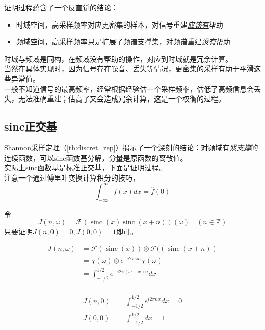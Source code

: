 	证明过程蕴含了一个反直觉的结论：

	\begin{itemize}
		\item 时域空间，高采样频率对应更密集的样本，对信号重建\underline{\textit{应该有}}帮助
		\item 频域空间，高采样频率只是扩展了频谱支撑集，对频谱重建\underline{\textit{没有}}帮助
	\end{itemize}
	
	时域与频域是同构，在频域没有帮助的操作，对应到时域就是冗余计算。\\

	当然在具体实现时，因为信号存在噪音、丢失等情况，更密集的采样有助于平滑这些异常值。\\

	一般不知道信号的最高频率，经常根据经验估一个采样频率，估低了高频信息会丢失，无法准确重建；估高了又会造成冗余计算，这是一个权衡的过程。

\subsection{sinc正交基}
	
	Shannon采样定理（\ref{th:discret_rep}）揭示了一个深刻的结论：对频域有\textit{紧支撑}的连续函数，可以sinc函数基分解，分量是原函数的离散值。\\

	实际上sinc函数基是标准正交基，下面是证明过程。\\

	注意一个通过傅里叶变换计算积分的技巧，
	$$
		\int_{-\infty}^{\infty} f(x) dx = \hat{f}(0)
	$$

	令
	$$
		J(n,\omega) = \mathcal{F}(\mathop{sinc}(x)\mathop{sinc}(x+n)) (\omega)\quad (n\in \mathbb{Z})
	$$
	只要证明$J(n,0)=0,J(0,0) = 1$即可。

	\begin{align*}	
		J(n,\omega) &= \mathcal{F}(\mathop{sinc}(x)) \otimes \mathcal{F}((\mathop{sinc}(x+n)) \\
		& = \chi(\omega) \otimes e^{-i2\pi \omega n} \chi(\omega) \\
		& = \int_{-1/2}^{1/2} e^{-i2\pi (\omega -x) n} dx\\
	\end{align*}

	$$
		\begin{aligned}
				J(n,0)&= \int_{-1/2}^{1/2} e^{i2\pi nx } dx =0 \\
				J(0,0)&= \int_{-1/2}^{1/2} dx = 1		
		\end{aligned}
	$$

